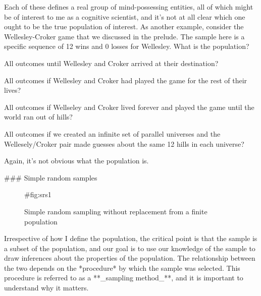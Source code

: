 Each of these defines a real group of mind-possessing entities, all of which might be of interest to me as a cognitive scientist, and it's not at all clear which one ought to be the true population of interest. As another example, consider the Wellesley-Croker game that we discussed in the prelude. The sample here is a specific sequence of 12 wins and 0 losses for Wellesley. What is the population?
 \itemsep -2pt
\item All outcomes until Wellesley and Croker arrived at their destination?
\item All outcomes if Wellesley and Croker had played the game for the rest of their lives?
\item All outcomes if Wellseley and Croker lived forever and played the game until the world ran out of hills?
\item All outcomes if we created an infinite set of parallel universes and the Wellesely/Croker pair made guesses about the same 12 hills in each universe?

Again, it's not obvious what the population is.

### Simple random samples

\begin{figure}[t]
\begin{center}
\end{center}
\caption{Simple random sampling without replacement from a finite population}
{#fig:srs1}
\HR
\end{figure}

Irrespective of how I define the population, the critical point is that the sample is a subset of the population, and our goal is to use our knowledge of the sample to draw inferences about the properties of the population. The relationship between the two depends on the *procedure* by which the sample was selected. This procedure is referred to as a **_sampling method_**, and it is important to understand why it matters.


